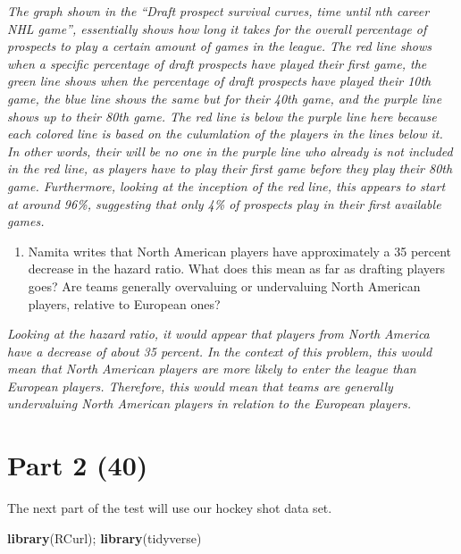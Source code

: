 \documentclass[]{article}
\newenvironment{Shaded}{\begin{snugshade}}{\end{snugshade}}
\newcommand{\KeywordTok}[1]{\textcolor[rgb]{0.13,0.29,0.53}{\textbf{#1}}}
\newcommand{\NormalTok}[1]{#1}
\providecommand{\tightlist}{%
  \setlength{\itemsep}{0pt}\setlength{\parskip}{0pt}}
\begin{document}
\emph{The graph shown in the ``Draft prospect survival curves, time
until nth career NHL game'', essentially shows how long it takes for the
overall percentage of prospects to play a certain amount of games in the
league. The red line shows when a specific percentage of draft prospects
have played their first game, the green line shows when the percentage
of draft prospects have played their 10th game, the blue line shows the
same but for their 40th game, and the purple line shows up to their 80th
game. The red line is below the purple line here because each colored
line is based on the culumlation of the players in the lines below it.
In other words, their will be no one in the purple line who already is
not included in the red line, as players have to play their first game
before they play their 80th game. Furthermore, looking at the inception
of the red line, this appears to start at around 96\%, suggesting that
only 4\% of prospects play in their first available games.}

\begin{enumerate}
\def\labelenumi{\arabic{enumi}.}
\setcounter{enumi}{3}
\tightlist
\item
  Namita writes that North American players have approximately a 35
  percent decrease in the hazard ratio. What does this mean as far as
  drafting players goes? Are teams generally overvaluing or undervaluing
  North American players, relative to European ones?
\end{enumerate}

\emph{Looking at the hazard ratio, it would appear that players from
North America have a decrease of about 35 percent. In the context of
this problem, this would mean that North American players are more
likely to enter the league than European players. Therefore, this would
mean that teams are generally undervaluing North American players in
relation to the European players.}

\hypertarget{part-2-40}{%
\section{Part 2 (40)}\label{part-2-40}}

The next part of the test will use our hockey shot data set.

\begin{Shaded}
\begin{Highlighting}[]
\KeywordTok{library}\NormalTok{(RCurl); }\KeywordTok{library}\NormalTok{(tidyverse)}
\end{Highlighting}
\end{Shaded}
\end{document}
